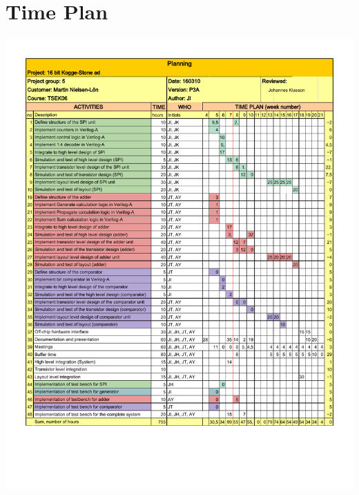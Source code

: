 \section{Time Plan} \label{app:time_plan}

\includegraphics[scale=0.7]{../figures/TSEK06_G05_timeplan_P3A.pdf}
